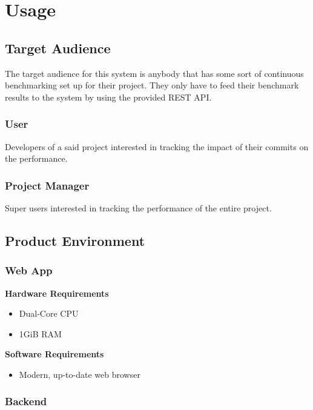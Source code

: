 \section{Usage}

\subsection{Target Audience}

The target audience for this system is anybody that has some sort of continuous benchmarking set up for their project. They only have to feed their benchmark results to the system by using the provided \gls{REST API}.

\subsubsection*{User}

Developers of a said project interested in tracking the impact of their commits on the performance.

\subsubsection*{Project Manager}

Super users interested in tracking the performance of the entire project.

\subsection{Product Environment}

\subsubsection*{Web App}

\textbf{Hardware Requirements}
\begin{itemize}
    \item Dual-Core CPU
    \item 1GiB RAM
\end{itemize}

\textbf{Software Requirements}
\begin{itemize}
    \item Modern, up-to-date web browser
\end{itemize}

\subsubsection*{Backend}

